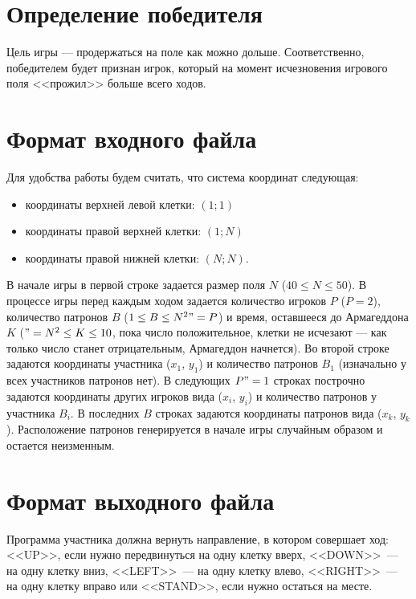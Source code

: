 \documentclass[a4paper,12pt]{article}
\begin{document}
\section{Определение победителя}
Цель игры --- продержаться на поле как можно дольше. Соответственно, победителем будет признан игрок, который на момент исчезновения игрового поля <<прожил>> больше всего ходов.

\section{Формат входного файла}
Для удобства работы будем считать, что система координат следующая:
\begin{itemize}
\item координаты верхней левой клетки: $(1;1)$
\item координаты правой верхней клетки: $(1;N)$
\item координаты правой нижней клетки: $(N;N)$.
\end{itemize}

\begin{flushleft}
В начале игры в первой строке задается размер поля $N$ ($40 \leq N \leq 50$). В процессе игры перед каждым ходом задается количество игроков $P$ ($P = 2$), количество патронов $B$ ($1 \leq B \leq N^2"=P$) и время, оставшееся до Армагеддона $K$ ($"=N^2 \leq K \leq 10$, пока число положительное, клетки не исчезают --- как только число станет отрицательным, Армагеддон начнется).
Во второй строке задаются координаты участника ($x_1$, $y_1$) и количество патронов $B_1$ (изначально у всех участников патронов нет).
В следующих $P"=1$ строках построчно задаются координаты других игроков вида ($x_i$, $y_i$) и количество патронов у участника $B_i$.
В последних $B$ строках задаются координаты патронов вида ($x_k$, $y_k$). Расположение патронов генерируется в начале игры случайным образом и остается неизменным.
\end{flushleft}

\section{Формат выходного файла}
Программа участника должна вернуть направление, в котором совершает ход: <<UP>>, если нужно передвинуться на одну клетку вверх, <<DOWN>>~--- на одну клетку вниз, <<LEFT>>~--- на одну клетку влево, <<RIGHT>>~--- на одну клетку вправо или <<STAND>>, если нужно остаться на месте.
\end{document}

